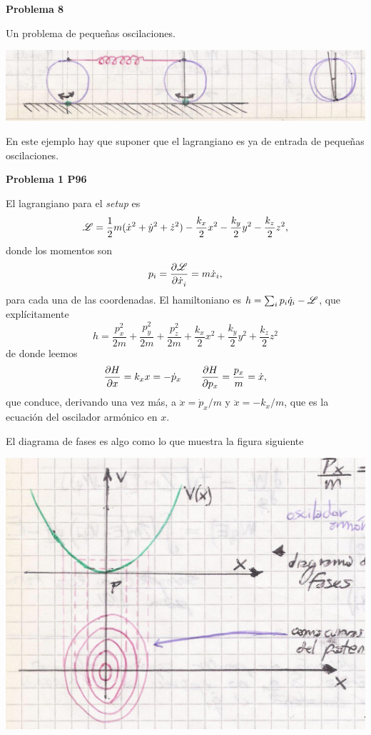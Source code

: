 \documentclass[10pt,oneside]{CBFT_book}
\begin{document}
\begin{ejemplo}{\bf Problema 8}

Un problema de pequeñas oscilaciones.

\includegraphics[scale=0.5]{images/fig_mc_problema_8.jpg} 

En este ejemplo hay que suponer que el lagrangiano es ya de entrada de pequeñas oscilaciones.

\end{ejemplo}

\begin{ejemplo}{\bf Problema 1 P96}

El lagrangiano para el {\it setup} es 
\[
	\mathscr{L} = \frac 1 2 m ( \dot{x}^2 + \dot{y}^2 + \dot{z}^2 ) - \frac{k_x}{2} x^2 - \frac{k_y}{2} y^2 - \frac{k_z}{2} z^2,
\]
donde los momentos son 
\[
	p_i = \frac{\partial^{\hspace{-0.05em}} {\mathscr{L}}}{\partial {\dot{x}_i}^{\hspace{-0.05em}}} = m\dot{x}_i,
\]
para cada una de las coordenadas. El hamiltoniano es $h = \sum_i p_i \dot{q}_i - \mathscr{L}$, que explícitamente
\[
	h = \frac{p_x^2}{2m} + \frac{p_y^2}{2m} + \frac{p_z^2}{2m} + \frac{k_x}{2} x^2 + \frac{k_y}{2} y^2 + \frac{k_z}{2} z^2
\]
de donde leemos
\[
	\frac{\partial^{\hspace{-0.05em}} {H}}{\partial {x}^{\hspace{-0.05em}}} = k_x x = - \dot{p}_x \qquad \frac{\partial^{\hspace{-0.05em}} {H}}{\partial {p_x}^{\hspace{-0.05em}}} = \frac{p_x}{m} = \dot{x},
\]
que conduce, derivando una vez más, a $ \ddot{x} = \dot{p}_x / m $ y $ \ddot{x} = - k_x / m $, que es la ecuación del oscilador
armónico en $x$.
 
El diagrama de fases es algo como lo que muestra la figura siguiente
 
\includegraphics[scale=0.35]{images/fig_mc_problema_1_p96.jpg} 


\end{ejemplo}
\end{document}
